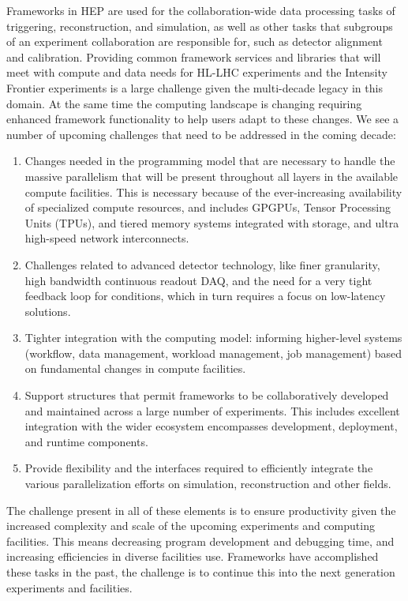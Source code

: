\documentclass[12pt,a4paper]{article}
\begin{document}
Frameworks in HEP are used for the collaboration-wide data processing
tasks of triggering, reconstruction, and simulation, as well as other tasks that
subgroups of an experiment collaboration are responsible for, such as
detector alignment and calibration. 
Providing common framework services and libraries that will meet with
compute and data needs for HL-LHC experiments and the Intensity Frontier
experiments is a large challenge given the multi-decade legacy in this
domain. At the same time the computing landscape is changing requiring
enhanced framework functionality to help users adapt to these changes.
We see a number of upcoming challenges that need to be addressed in the
coming decade:

\begin{enumerate}
\item
    Changes needed in the programming model that are necessary to
    handle the massive parallelism that will be present throughout all
    layers in the available compute facilities. This is necessary
    because of the ever-increasing availability of specialized compute
    resources, and includes GPGPUs, Tensor Processing Units (TPUs),
    and tiered memory systems integrated with storage, and ultra
    high-speed network interconnects.
\item
    Challenges related to advanced detector technology, like finer
    granularity, high bandwidth continuous readout DAQ, and the need
    for a very tight feedback loop for conditions, which in turn
    requires a focus on low-latency solutions.
\item
    Tighter integration with the computing model: informing
    higher-level systems (workflow, data management, workload
    management, job management) based on fundamental changes in
    compute facilities.
\item
    Support structures that permit frameworks to be collaboratively
    developed and maintained across a large number of
    experiments. This includes excellent integration with the wider
    ecosystem encompasses development, deployment, and runtime
    components.
\item
    Provide flexibility and the interfaces required to efficiently
    integrate the various parallelization efforts on simulation,
    reconstruction and other fields.
\end{enumerate}

The challenge present in all of these elements is to ensure
productivity given the increased complexity and scale of the upcoming
experiments and computing facilities. This means decreasing program
development and debugging time, and increasing efficiencies in diverse
facilities use.  Frameworks have accomplished these tasks in the past,
the challenge is to continue this into the next generation experiments
and facilities.
\end{document}
